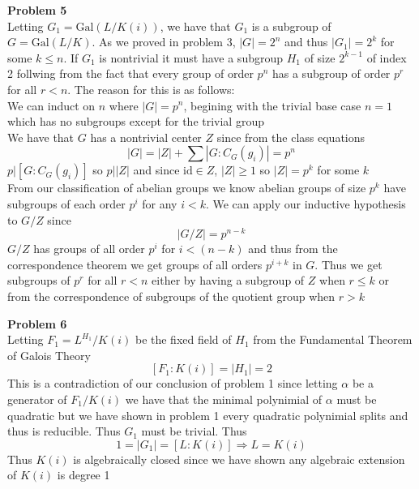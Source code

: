 \documentclass[12pt]{article}
\newenvironment{ques}[1]{\textbf{Problem #1}\vspace{1 mm}\\ }{\bigskip}
\theoremstyle{definition}
\renewcommand{\a}{\alpha}
\newcommand{\Gal}{\text{Gal}}
\newcommand{\id}{\text{id}}
\begin{document}
\begin{ques}{5}
	Letting $G_1 = \Gal(L/K(i))$, we have that $G_1$ is a subgroup of $G =
	\Gal(L/K)$. As we proved in problem 3, $|G| = 2^n$ and thus $|G_1| = 2^k$ for some
	$k \leq n$. If $G_1$ is nontrivial it must have a subgroup $H_1$ of size
	$2^{k-1}$ of index 2 follwing from the fact that every group of order $p^n$
	has a subgroup of order $p^{r}$ for all $r < n$. The reason for this is as follows:\\
	We can induct on $n$ where $|G| = p^n$, begining with the trivial base case
	$n = 1$ which has no subgroups except for the trivial group\\
	We have that $G$ has a nontrivial center $Z$ since from the class equations
	$$|G| = |Z| + \sum |G : C_G(g_i)| = p^n$$
	$p | [G:C_G(g_i)]$ so $p| |Z|$ and since $\id \in Z$, $|Z| \geq 1$ so $|Z|
	= p^k$ for some $k$\\
	From our classification of abelian groups we know abelian groups of size
	$p^k$ have subgroups of each order $p^i$ for any $i < k$. We can apply our
	inductive hypothesis to $G/Z$ since
	$$|G/Z| = p^{n - k}$$
	$G/Z$ has groups of all order $p^i$ for $i < (n-k)$ and thus from the
	correspondence theorem we get groups of all orders $p^{i + k}$ in $G$. Thus
	we get subgroups of $p^r$ for all $r < n$ either by having a subgroup of
	$Z$ when $r \leq k$ or from the correspondence of subgroups of the quotient
	group when $r > k$


\end{ques}

\begin{ques}{6}
	Letting $F_1 = L^{H_1}/K(i)$ be the fixed field of $H_1$ from the Fundamental
	Theorem of Galois Theory
	$$[F_1 : K(i)] = |H_1| = 2$$
	This is a contradiction of our conclusion of problem 1 since
	letting $\a$ be a generator of $F_1/K(i)$ we have that the minimal
	polynimial of $\a$ must be quadratic but we have shown in problem 1 every
	quadratic polynimial splits and thus is reducible. Thus $G_1$ must be trivial. Thus
	$$1 = |G_1| = [L:K(i)] \Rightarrow L = K(i)$$
	Thus $K(i)$ is algebraically closed since we have shown any algebraic
	extension of $K(i)$ is degree 1
\end{ques}
\end{document}
